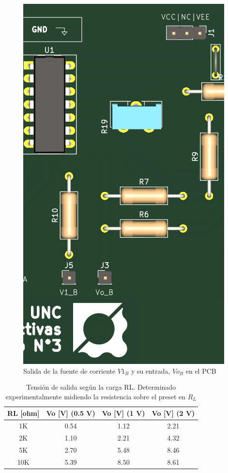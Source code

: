 \begin{figure}[H]
    \centering
    \includegraphics[width=0.5\linewidth]{pcb2.png}
    \caption{Salida de la fuente de corriente $V1_B$ y su entrada, $Vo_B$ en el PCB}
    \label{fig:enter-label}
\end{figure}

\begin{table}[H]
\centering
\begin{tabular}{|c|c|c|c|}
\hline
\textbf{RL [ohm]} & \textbf{Vo [V] (0.5 V)} & \textbf{Vo [V] (1 V)} & \textbf{Vo [V] (2 V)} \\ \hline
1K    & 0.54  & 1.12  & 2.21  \\ \hline
2K    & 1.10  & 2.21   & 4.32  \\ \hline
5K    & 2.70   & 5.48   & 8.46  \\ \hline
10K   & 5.39   & 8.50   & 8.61  \\ \hline
\end{tabular}
\caption{Tensión de salida según la carga RL. Determinado experimentalmente midiendo la resistencia sobre el preset en $R_L$}
\label{tab:Vo_vs_RL}
\end{table}




